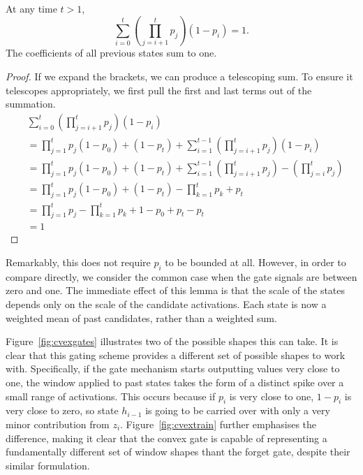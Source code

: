 \begin{prop} 
At any time \(t > 1\),
	\begin{equation} \label{eq:cvexforward}
		\sum_{i=0}^t \left(\prod_{j=i+1}^t p_j\right) (1 - p_i) = 1.
	\end{equation}
The coefficients of all previous states sum to one.
\label{prop:convexsum}
\end{prop}
\begin{proof}
If we expand the brackets, we can produce a telescoping sum. To ensure it telescopes
appropriately, we first pull the first and last terms out of the summation.
\begin{align}
    &\sum_{i=0}^t \left(\prod_{j=i+1}^t p_j\right) (1 - p_i) \\
    &= \prod_{j=1}^tp_j(1-p_0) + (1-p_t) + \sum_{i=1}^{t-1} \left(\prod_{j=i+1}^t p_j\right) (1 - p_i) \\
    &= \prod_{j=1}^tp_j(1-p_0) + (1-p_t) + \sum_{i=1}^{t-1} \left(\prod_{j=i+1}^t p_j\right) - \left(\prod_{j=i}^t p_j\right) \\
    &= \prod_{j=1}^tp_j(1-p_0) + (1-p_t) - \prod_{k=1}^t p_k + p_t \\
    &= \prod_{j=1}^tp_j - \prod_{k=1}^tp_k + 1 - p_0 + p_t - p_t \\
    &= 1
\end{align}
\end{proof}

Remarkably, this does not require \(p_i\) to be bounded at all. However, in order to compare
directly, we consider the common case when the gate signals
are between zero and one. The immediate effect of this lemma is that the scale of the states
depends only on the scale of the candidate activations. Each state is now a weighted mean of
past candidates, rather than a weighted sum.

Figure~\ref{fig:cvexgates} illustrates two of the possible shapes this can take. It is clear
that this gating scheme provides a different set of possible shapes to work with.
Specifically, if the gate mechanism starts outputting values very close to one, the window
applied to past states takes the form of a distinct spike over a small range of activations.
This occurs because if \(p_i\) is very close to one, \(1 - p_i\) is very close to zero, so
state \(h_{i-1}\) is going to be carried over with only a very minor contribution from
\(z_i\). Figure~\ref{fig:cvextrain} further emphasises the difference, making it clear that
the convex gate is capable of representing a fundamentally different set of window shapes
thant the forget gate, despite their similar formulation.

